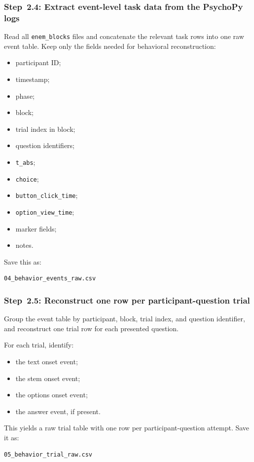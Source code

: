 \subsubsection{Step~2.4: Extract event-level task data from the PsychoPy logs}
Read all \texttt{enem\_blocks} files and concatenate the relevant task rows into one raw event table.
Keep only the fields needed for behavioral reconstruction:
\begin{itemize}
    \item participant ID;
    \item timestamp;
    \item phase;
    \item block;
    \item trial index in block;
    \item question identifiers;
    \item \texttt{t\_abs};
    \item \texttt{choice};
    \item \texttt{button\_click\_time};
    \item \texttt{option\_view\_time};
    \item marker fields;
    \item notes.
\end{itemize}

Save this as:
\begin{verbatim}
04_behavior_events_raw.csv
\end{verbatim}

\subsubsection{Step~2.5: Reconstruct one row per participant-question trial}
Group the event table by participant, block, trial index, and question identifier, and reconstruct one trial row for each presented question.

For each trial, identify:
\begin{itemize}
    \item the text onset event;
    \item the stem onset event;
    \item the options onset event;
    \item the answer event, if present.
\end{itemize}

This yields a raw trial table with one row per participant-question attempt.
Save it as:
\begin{verbatim}
05_behavior_trial_raw.csv
\end{verbatim}

